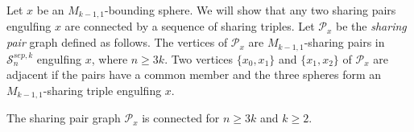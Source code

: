 Let $x$ be an $M_{k-1,1}$-bounding sphere.
We will show that any two sharing pairs engulfing $x$
are connected by a sequence of sharing triples.
Let $\mathcal P_x$ be the \emph{sharing pair} graph defined as follows.
The vertices of $\mathcal P_x$ are $M_{k-1,1}$-sharing pairs in
$\mathcal S^{sep,k}_n$ engulfing
$x$, where $n\geq 3k$.
Two vertices $\{x_0,x_1\}$ and $\{x_1,x_2\}$
of $\mathcal P_x$ are adjacent if the pairs
have a common member and the three spheres
form an $M_{k-1,1}$-sharing triple engulfing $x$.



\begin{lemma}
  The sharing pair graph $\mathcal P_x$ is connected for $n\geq 3k$ and $k\geq 2$.
  \label{lem:kshareconnect}
\end{lemma}

